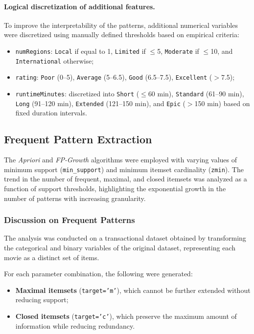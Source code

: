 \documentclass{article}
\begin{document}
\paragraph{Logical discretization of additional features.}
To improve the interpretability of the patterns, additional numerical variables were discretized using manually defined thresholds based on empirical criteria:

\begin{itemize}
  \item \texttt{numRegions}: \texttt{Local} if equal to 1, \texttt{Limited} if $\leq$5, \texttt{Moderate} if $\leq$10, and \texttt{International} otherwise;
  \item \texttt{rating}: \texttt{Poor} (0--5), \texttt{Average} (5--6.5), \texttt{Good} (6.5--7.5), \texttt{Excellent} ($>$7.5);
\item \texttt{runtimeMinutes}: discretized into \texttt{Short} ($\leq$60 min), \texttt{Standard} (61–90 min), \texttt{Long} (91–120 min), \texttt{Extended} (121–150 min), and \texttt{Epic} ($>$150 min) based on fixed duration intervals.

\end{itemize}



\subsection{Frequent Pattern Extraction}
The \textit{Apriori} and \textit{FP-Growth} algorithms were employed with varying values of minimum support (\texttt{min\_support}) and minimum itemset cardinality (\texttt{zmin}). The trend in the number of frequent, maximal, and closed itemsets was analyzed as a function of support thresholds, highlighting the exponential growth in the number of patterns with increasing granularity.
\subsubsection{Discussion on Frequent Patterns}

The analysis was conducted on a transactional dataset obtained by transforming the categorical and binary variables of the original dataset, representing each movie as a distinct set of items.

For each parameter combination, the following were generated:
\begin{itemize}
    \item \textbf{Maximal itemsets} (\texttt{target='m'}), which cannot be further extended without reducing support;
    \item \textbf{Closed itemsets} (\texttt{target='c'}), which preserve the maximum amount of information while reducing redundancy.
\end{itemize}
\end{document}
